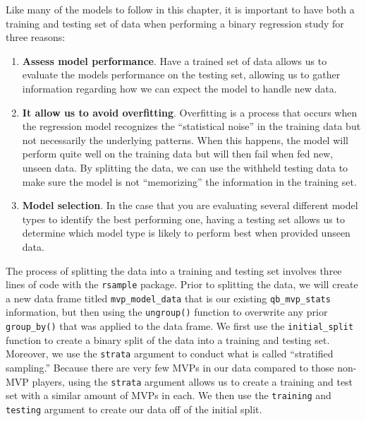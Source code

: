\documentclass[
  letterpaper,
]{krantz}
\providecommand{\tightlist}{%
  \setlength{\itemsep}{0pt}\setlength{\parskip}{0pt}}\usepackage{longtable,booktabs,array}
\begin{document}
\begin{tcolorbox}[enhanced jigsaw, colback=white, leftrule=.75mm, breakable, colframe=quarto-callout-important-color-frame, bottomtitle=1mm, rightrule=.15mm, left=2mm, opacityback=0, bottomrule=.15mm, arc=.35mm, coltitle=black, colbacktitle=quarto-callout-important-color!10!white, toptitle=1mm, titlerule=0mm, title=\textcolor{quarto-callout-important-color}{\faExclamation}\hspace{0.5em}{Important}, toprule=.15mm, opacitybacktitle=0.6]

Like many of the models to follow in this chapter, it is important to
have both a training and testing set of data when performing a binary
regression study for three reasons:

\begin{enumerate}
\def\labelenumi{\arabic{enumi}.}
\tightlist
\item
  \textbf{Assess model performance}. Have a trained set of data allows
  us to evaluate the models performance on the testing set, allowing us
  to gather information regarding how we can expect the model to handle
  new data.
\item
  \textbf{It allow us to avoid overfitting}. Overfitting is a process
  that occurs when the regression model recognizes the ``statistical
  noise'' in the training data but not necessarily the underlying
  patterns. When this happens, the model will perform quite well on the
  training data but will then fail when fed new, unseen data. By
  splitting the data, we can use the withheld testing data to make sure
  the model is not ``memorizing'' the information in the training set.
\item
  \textbf{Model selection}. In the case that you are evaluating several
  different model types to identify the best performing one, having a
  testing set allows us to determine which model type is likely to
  perform best when provided unseen data.
\end{enumerate}

\end{tcolorbox}

The process of splitting the data into a training and testing set
involves three lines of code with the \texttt{rsample} package. Prior to
splitting the data, we will create a new data frame titled
\texttt{mvp\_model\_data} that is our existing \texttt{qb\_mvp\_stats}
information, but then using the \texttt{ungroup()} function to overwrite
any prior \texttt{group\_by()} that was applied to the data frame. We
first use the \texttt{initial\_split} function to create a binary split
of the data into a training and testing set. Moreover, we use the
\texttt{strata} argument to conduct what is called ``stratified
sampling.'' Because there are very few MVPs in our data compared to
those non-MVP players, using the \texttt{strata} argument allows us to
create a training and test set with a similar amount of MVPs in each. We
then use the \texttt{training} and \texttt{testing} argument to create
our data off of the initial split.
\end{document}

